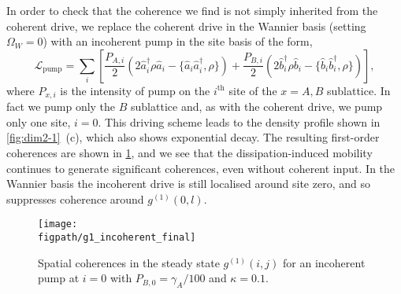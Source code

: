 In order to check that the coherence we find is not simply inherited from the coherent drive, we replace the coherent drive in the Wannier basis (setting \(\Omega_{W} = 0\)) with an incoherent pump in the site basis of the form,
\begin{equation}
	\mathcal{L}_{\mathrm{pump}} = \sum_{i}\left[\frac{P_{A,i}}{2}\left(2\hat{a}_{i}^{\dagger}\rho\hat{a}_{i} - \{\hat{a}_{i}\hat{a}_{i}^{\dagger}, \rho\}\right) + \frac{P_{B,i}}{2}\left(2\hat{b}_{i}^{\dagger}\rho\hat{b}_{i} - \{\hat{b}_{i}\hat{b}_{i}^{\dagger}, \rho\}\right) \right],
	\label{eq:dim2-6}
\end{equation}
where \(P_{x,i}\) is the intensity of pump on the \(i^{\mathrm{th}}\) site of the \(x = A,B\) sublattice. In fact we pump only the \(B\) sublattice and, as with the coherent drive, we pump only one site, \(i=0\). This driving scheme leads to the density profile shown in \cref{fig:dim2-1}~(c), which also shows exponential decay. The resulting first-order coherences are shown in \cref{fig:dim2-3}, and we see that the dissipation-induced mobility continues to generate significant coherences, even without coherent input. In the Wannier basis the incoherent drive is still localised around site zero, and so suppresses coherence around \(g^{(1)}(0,l)\). 

\begin{figure}[ht!]
\centering 
\texttt{[image: \\figpath/g1\_incoherent\_final]}
\caption{\label{fig:dim2-3}Spatial coherences in the steady state \(g^{(1)}(i,j)\) for an incoherent pump at \(i=0\) with \(P_{B,0} = \gamma_{A}/100\) and \(\kappa = 0.1\).}
\end{figure}

